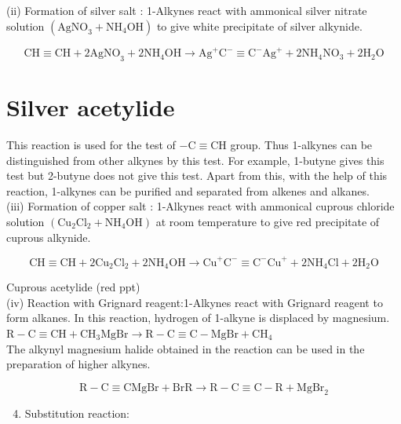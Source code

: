 \documentclass[10pt]{article}
\begin{document}
(ii) Formation of silver salt : 1-Alkynes react with ammonical silver nitrate solution $\left(\mathrm{AgNO}_{3}+\mathrm{NH}_{4} \mathrm{OH}\right)$ to give white precipitate of silver alkynide.

$$
\mathrm{CH} \equiv \mathrm{CH}+2 \mathrm{AgNO}_{3}+2 \mathrm{NH}_{4} \mathrm{OH} \longrightarrow \mathrm{Ag}^{+} \mathrm{C}^{-} \equiv \mathrm{C}^{-} \mathrm{Ag}^{+}+2 \mathrm{NH}_{4} \mathrm{NO}_{3}+2 \mathrm{H}_{2} \mathrm{O}
$$

\section*{Silver acetylide}
This reaction is used for the test of $-\mathrm{C} \equiv \mathrm{CH}$ group. Thus 1-alkynes can be distinguished from other alkynes by this test. For example, 1-butyne gives this test but 2-butyne does not give this test. Apart from this, with the help of this reaction, 1-alkynes can be purified and separated from alkenes and alkanes.\\
(iii) Formation of copper salt : 1-Alkynes react with ammonical cuprous chloride solution $\left(\mathrm{Cu}_{2} \mathrm{Cl}_{2}+\mathrm{NH}_{4} \mathrm{OH}\right)$ at room temperature to give red precipitate of cuprous alkynide.

$$
\mathrm{CH} \equiv \mathrm{CH}+2 \mathrm{Cu}_{2} \mathrm{Cl}_{2}+2 \mathrm{NH}_{4} \mathrm{OH} \rightarrow \mathrm{Cu}^{+} \mathrm{C}^{-} \equiv \mathrm{C}^{-} \mathrm{Cu}^{+}+2 \mathrm{NH}_{4} \mathrm{Cl}+2 \mathrm{H}_{2} \mathrm{O}
$$

Cuprous acetylide (red ppt)\\
(iv) Reaction with Grignard reagent:1-Alkynes react with Grignard reagent to form alkanes. In this reaction, hydrogen of 1-alkyne is displaced by magnesium.\\
$\mathrm{R}-\mathrm{C} \equiv \mathrm{CH}+\mathrm{CH}_{3} \mathrm{MgBr} \rightarrow \mathrm{R}-\mathrm{C} \equiv \mathrm{C}-\mathrm{MgBr}+\mathrm{CH}_{4}$\\
The alkynyl magnesium halide obtained in the reaction can be used in the preparation of higher alkynes.

$$
\mathrm{R}-\mathrm{C} \equiv \mathrm{CMgBr}+\mathrm{BrR} \longrightarrow \mathrm{R}-\mathrm{C} \equiv \mathrm{C}-\mathrm{R}+\mathrm{MgBr}_{2}
$$

\begin{enumerate}
  \setcounter{enumi}{3}
  \item Substitution reaction:
\end{enumerate}
\end{document}
